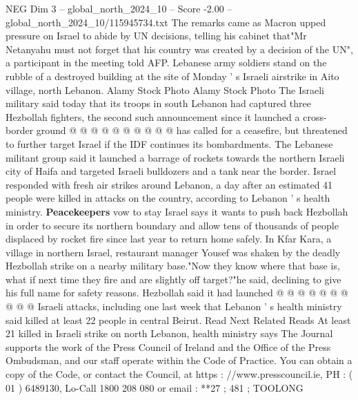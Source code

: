 \begin{textsample}{NEG Dim 3 – global\_north\_2024\_10 – Score -2.00 – global\_north\_2024\_10/115945734.txt}
The remarks came as Macron upped pressure on Israel to abide by UN decisions, telling his cabinet that"Mr Netanyahu must not forget that his country was created by a decision of the UN", a participant in the meeting told AFP.
Lebanese army soldiers stand on the rubble of a destroyed building at the site of Monday ' s Israeli airstrike in Aito village, north Lebanon.
Alamy Stock Photo Alamy Stock Photo The Israeli military said today that its troops in south Lebanon had captured three Hezbollah fighters, the second such announcement since it launched a cross-border ground @ @ @ @ @ @ @ @ @ @ has called for a ceasefire, but threatened to further target Israel if the IDF continues its bombardments.
The Lebanese militant group said it launched a barrage of rockets towards the northern Israeli city of Haifa and targeted Israeli bulldozers and a tank near the border.
Israel responded with fresh air strikes around Lebanon, a day after an estimated 41 people were killed in attacks on the country, according to Lebanon ' s health ministry. \textbf{Peacekeepers} vow to stay Israel says it wants to push back Hezbollah in order to secure its northern boundary and allow tens of thousands of people displaced by rocket fire since last year to return home safely.
In Kfar Kara, a village in northern Israel, restaurant manager Yousef was shaken by the deadly Hezbollah strike on a nearby military base."Now they know where that base is, what if next time they fire and are slightly off target?"he said, declining to give his full name for safety reasons.
Hezbollah said it had launched @ @ @ @ @ @ @ @ @ @ Israeli attacks, including one last week that Lebanon ' s health ministry said killed at least 22 people in central Beirut.
Read Next Related Reads At least 21 killed in Israeli strike on north Lebanon, health ministry says The Journal supports the work of the Press Council of Ireland and the Office of the Press Ombudsman, and our staff operate within the Code of Practice.
You can obtain a copy of the Code, or contact the Council, at https : //www.presscouncil.ie, PH : ( 01 ) 6489130, Lo-Call 1800 208 080 or email : **27 ; 481 ; TOOLONG

\end{textsample}
